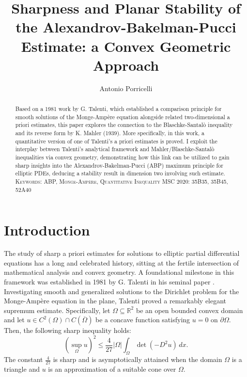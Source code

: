 \documentclass{article}
\title{Sharpness and Planar Stability of the Alexandrov-Bakelman-Pucci Estimate: a Convex Geometric Approach}
\author{Antonio Porricelli}
\date{}
\numberwithin{equation}{section}
\begin{document}
\maketitle
\begin{abstract}
\noindent Based on a 1981 work by G. Talenti, which established a comparison principle for smooth solutions of the Monge-Ampère equation alongside related two-dimensional a priori estimates, this paper explores the connection to the Blaschke-Santalò inequality and its reverse form by K. Mahler (1939). More specifically, in this work, a quantitative version of one of Talenti's a priori estimates is proved. I exploit the interplay between Talenti's analytical framework and Mahler/Blaschke-Santalò inequalities via convex geometry, demonstrating how this link can be utilized to gain sharp insights into the Alexandrov-Bakelman-Pucci (ABP) maximum principle for elliptic PDEs, deducing a stability result in dimension two involving such estimate.
\newline
\newline
\textsc{Keywords: ABP, Monge-Ampère, Quantitative Inequality}
\newline
\textsc{MSC 2020: 35B35, 35B45, 52A40}
\end{abstract}
\large
\section{Introduction}

The study of sharp a priori estimates for solutions to elliptic partial differential equations has a long and celebrated history, sitting at the fertile intersection of mathematical analysis and convex geometry. A foundational milestone in this framework was established in 1981 by G. Talenti in his seminal paper \cite{talenti1981}. Investigating smooth and generalized solutions to the Dirichlet problem for the Monge-Ampère equation in the plane, Talenti proved a remarkably elegant supremum estimate. Specifically, let $\Omega \subseteq \mathbb{R}^2$ be an open bounded convex domain and let $u \in C^2(\Omega) \cap C(\overline{\Omega})$ be a concave function satisfying $u = 0$ on $\partial \Omega$. Then, the following sharp inequality holds:
\begin{equation}\label{eq:talenti_classic}
(\sup_\Omega u)^2 \leq \frac{4}{27}|\Omega|\int_\Omega \det (-D^2u) \, dx.
\end{equation}
The constant $\frac{4}{27}$ is sharp and is asymptotically attained when the domain $\Omega$ is a triangle and $u$ is an approximation of a suitable cone over $\Omega$. 
\end{document}
